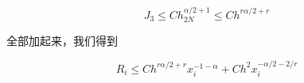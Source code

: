 \documentclass{ctexart}
\theoremstyle{definition}
\theoremstyle{remark}
\numberwithin{equation}{section}
\begin{document}
\begin{equation}
    J_3 \le C h_{2N}^{\alpha/2+1} \le C h^{r\alpha/2+r}
\end{equation}


全部加起来，我们得到

\begin{equation}
    R_i \le C h^{r\alpha/2+r}x_i^{-1-\alpha} + Ch^2 x_i^{-\alpha/2-2/r}
\end{equation}













\end{document}
